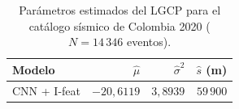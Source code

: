 \begin{table}[pos=H]
\centering
\caption{Par\'ametros estimados del LGCP para el cat\'alogo s\'ismico
de Colombia 2020 ($N=14\,346$ eventos).}
\label{tab:params_obs}
\begin{tabular}{lrrr}
\hline
Modelo & $\hat{\mu}$ & $\hat{\sigma}^2$ & $\hat{s}$ (m) \\
\hline
CNN + I-feat & $-20{,}6119$ & $3{,}8939$ & $59\,900$ \\
\hline
\end{tabular}
\end{table}
